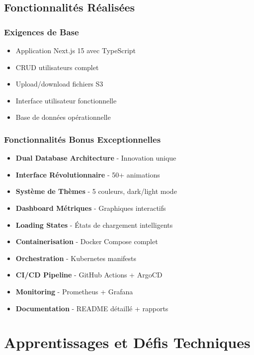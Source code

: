 \documentclass[12pt,a4paper]{report}
\begin{document}
\section{Fonctionnalités Réalisées}

\subsection{Exigences de Base}
\begin{itemize}[label=\textcolor{green}{$\checkmark$}]
    \item Application Next.js 15 avec TypeScript
    \item CRUD utilisateurs complet
    \item Upload/download fichiers S3
    \item Interface utilisateur fonctionnelle
    \item Base de données opérationnelle
\end{itemize}

\subsection{Fonctionnalités Bonus Exceptionnelles}
\begin{itemize}[label=\textcolor{primary}{$\star$}]
    \item \textbf{Dual Database Architecture} - Innovation unique
    \item \textbf{Interface Révolutionnaire} - 50+ animations
    \item \textbf{Système de Thèmes} - 5 couleurs, dark/light mode
    \item \textbf{Dashboard Métriques} - Graphiques interactifs
    \item \textbf{Loading States} - États de chargement intelligents
    \item \textbf{Containerisation} - Docker Compose complet
    \item \textbf{Orchestration} - Kubernetes manifests
    \item \textbf{CI/CD Pipeline} - GitHub Actions + ArgoCD
    \item \textbf{Monitoring} - Prometheus + Grafana
    \item \textbf{Documentation} - README détaillé + rapports
\end{itemize}

\chapter{Apprentissages et Défis Techniques}
\end{document}
